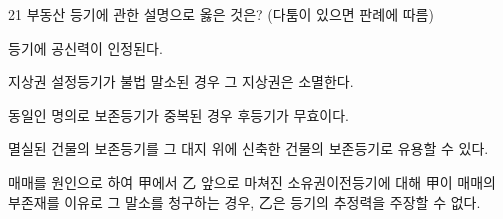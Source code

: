 \begin{question}{21}
부동산 등기에 관한 설명으로 옳은 것은? (다툼이 있으면 판례에 따름)
\begin{choices}
  \item 등기에 공신력이 인정된다.
  \item 지상권 설정등기가 불법 말소된 경우 그 지상권은 소멸한다.
  \item 동일인 명의로 보존등기가 중복된 경우 후등기가 무효이다.
  \item 멸실된 건물의 보존등기를 그 대지 위에 신축한 건물의 보존등기로 유용할 수 있다.
  \item 매매를 원인으로 하여 甲에서 乙 앞으로 마쳐진 소유권이전등기에 대해 甲이 매매의 부존재를 이유로 그 말소를 청구하는 경우, 乙은 등기의 추정력을 주장할 수 없다.
\end{choices}
\end{question}
